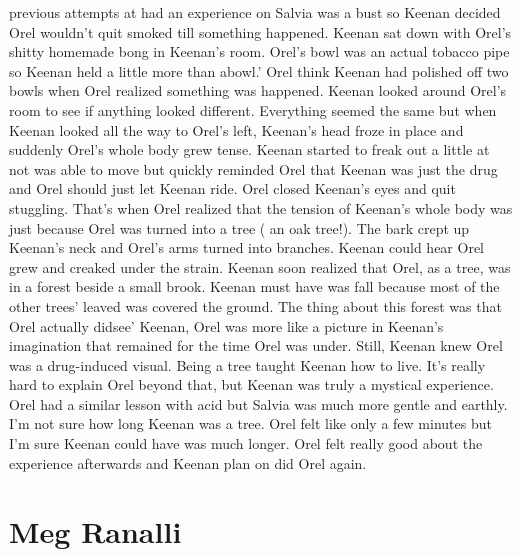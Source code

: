 \documentclass[12pt]{book}
\begin{document}
previous attempts at had an experience on Salvia was a bust so Keenan decided Orel wouldn't quit smoked till something happened. Keenan sat down with Orel's shitty homemade bong in Keenan's room. Orel's bowl was an actual tobacco pipe so Keenan held a little more than abowl.' Orel think Keenan had polished off two bowls when Orel realized something was happened. Keenan looked around Orel's room to see if anything looked different. Everything seemed the same but when Keenan looked all the way to Orel's left, Keenan's head froze in place and suddenly Orel's whole body grew tense. Keenan started to freak out a little at not was able to move but quickly reminded Orel that Keenan was just the drug and Orel should just let Keenan ride. Orel closed Keenan's eyes and quit stuggling. That's when Orel realized that the tension of Keenan's whole body was just because Orel was turned into a tree ( an oak tree!). The bark crept up Keenan's neck and Orel's arms turned into branches. Keenan could hear Orel grew and creaked under the strain. Keenan soon realized that Orel, as a tree, was in a forest beside a small brook. Keenan must have was fall because most of the other trees' leaved was covered the ground. The thing about this forest was that Orel actually didsee' Keenan, Orel was more like a picture in Keenan's imagination that remained for the time Orel was under. Still, Keenan knew Orel was a drug-induced visual. Being a tree taught Keenan how to live. It's really hard to explain Orel beyond that, but Keenan was truly a mystical experience. Orel had a similar lesson with acid but Salvia was much more gentle and earthly. I'm not sure how long Keenan was a tree. Orel felt like only a few minutes but I'm sure Keenan could have was much longer. Orel felt really good about the experience afterwards and Keenan plan on did Orel again.



\chapter{Meg Ranalli}
\end{document}
